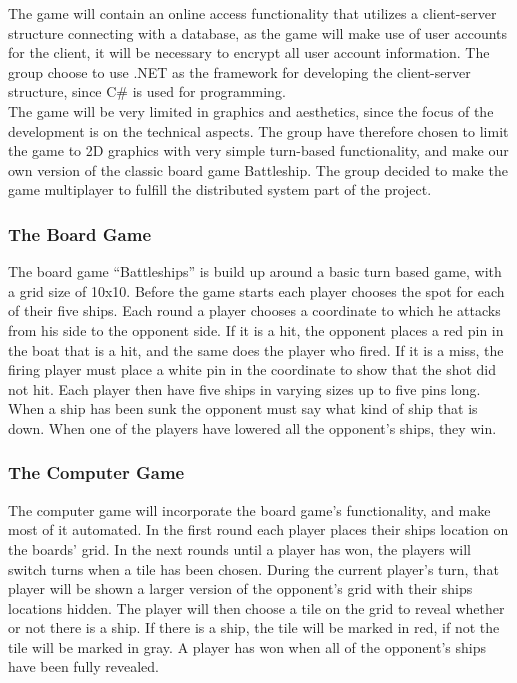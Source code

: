 The game will contain an online access functionality that utilizes
 a client-server structure connecting with a database, as the game will
  make use of user accounts for the client, it will be necessary to encrypt
   all user account information. The group choose to use .NET as the
    framework for developing the client-server structure, since C\# is used
     for programming. \\
The game will be very limited in graphics and aesthetics, since the
 focus of the development is on the technical aspects. The group have
  therefore chosen to limit the game to 2D graphics with very simple
   turn-based functionality, and make our own version of the classic
    board game Battleship. The group decided to make the game multiplayer
     to fulfill the distributed system part of the project.

\subsubsection{The Board Game}

The board game “Battleships” is build up around a basic turn based game,
with a grid size of 10x10. Before the game starts each player chooses the
 spot for each of their five ships. Each round a player chooses a coordinate
  to which he attacks from his side to the opponent side. If it is a hit, the
   opponent places a red pin in the boat that is a hit, and the same does the
    player who fired. If it is a miss, the firing player must place a white
     pin in the coordinate to show that the shot did not hit. Each player
      then have five ships in varying sizes up to five pins long. When a
       ship has been sunk the opponent must say what kind of ship that is
        down. When one of the players have lowered all the opponent's
         ships, they win.

\subsubsection{The Computer Game}

The computer game will incorporate the board game’s functionality,
 and make most of it automated. In the first round each player places
  their ships location on the boards’ grid. In the next rounds until a
   player has won, the players will switch turns when a tile has been
    chosen. During the current player’s turn, that player will be shown
     a larger version of the opponent’s grid with their ships locations
      hidden. The player will then choose a tile on the grid to reveal
       whether or not there is a ship. If there is a ship, the tile will
        be marked in red, if not the tile will be marked in gray. A player
         has won when all of the opponent's ships have been fully revealed.

